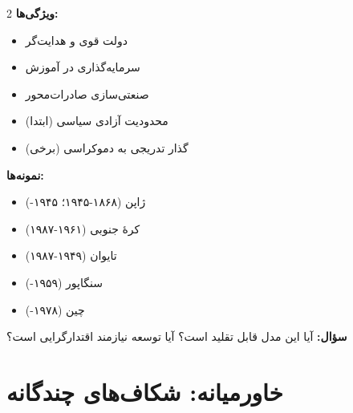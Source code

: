 \begin{tcolorbox}[
    enhanced,
    colback=goldaccent!10,
    colframe=goldaccent,
    boxrule=1.5pt,
    arc=5pt,
    fonttitle=\bfseries,
    title={\rl{🟡 الگوی توسعهٔ آسیای شرقی}}
]
\begin{multicols}{2}
\textbf{ویژگی‌ها:}
\begin{itemize}
    \item دولت قوی و هدایت‌گر
    \item سرمایه‌گذاری در آموزش
    \item صنعتی‌سازی صادرات‌محور
    \item محدودیت آزادی سیاسی (ابتدا)
    \item گذار تدریجی به دموکراسی (برخی)
\end{itemize}

\columnbreak

\textbf{نمونه‌ها:}
\begin{itemize}
    \item ژاپن (۱۸۶۸-۱۹۴۵؛ ۱۹۴۵-)
    \item کرهٔ جنوبی (۱۹۶۱-۱۹۸۷)
    \item تایوان (۱۹۴۹-۱۹۸۷)
    \item سنگاپور (۱۹۵۹-)
    \item چین (۱۹۷۸-)
\end{itemize}
\end{multicols}

\textbf{سؤال:} آیا این مدل قابل تقلید است؟ آیا توسعه نیازمند اقتدارگرایی است؟
\end{tcolorbox}

\section*{خاورمیانه: شکاف‌های چندگانه}

